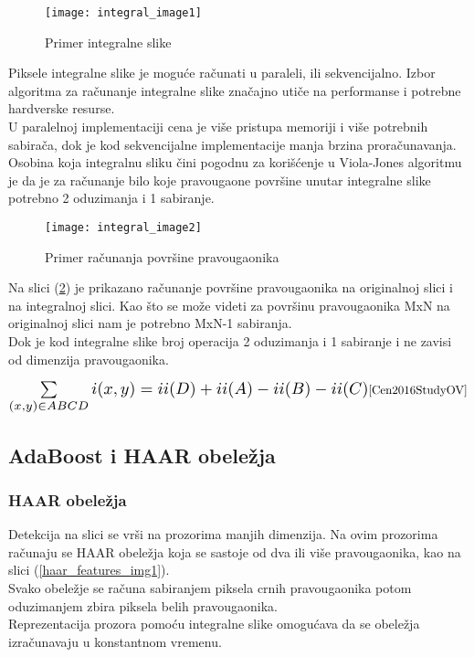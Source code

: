 \begin{figure}[h]
  \centering
  \texttt{[image: integral\_image1]}
  \caption{Primer integralne slike}
  \label{IntegralImage_img1}
\end{figure}

Piksele integralne slike je moguće računati u paraleli, ili
sekvencijalno. Izbor algoritma za računanje integralne slike značajno utiče na
performanse i potrebne hardverske resurse. \\
U paralelnoj implementaciji cena je
više pristupa memoriji i više potrebnih sabirača, dok je kod sekvencijalne
implementacije manja brzina proračunavanja. \\

Osobina koja integralnu sliku čini pogodnu za korišćenje u Viola-Jones algoritmu
je da je za računanje bilo koje pravougaone površine unutar integralne slike
potrebno 2 oduzimanja i 1 sabiranje.

\begin{figure}[h]
  \centering
  \texttt{[image: integral\_image2]}
  \caption{Primer računanja površine pravougaonika \cite{IntegralImage1_web}}
  \label{IntegralImage_img2}
\end{figure}

Na slici (\ref{IntegralImage_img2}) je prikazano računanje površine pravougaonika na
originalnoj slici i na integralnoj slici.
Kao što se može videti za površinu pravougaonika MxN na originalnoj slici nam je
potrebno MxN-1 sabiranja. \\
Dok je kod integralne slike broj operacija 2 oduzimanja i 1 sabiranje i ne zavisi od dimenzija pravougaonika.

\begin{equation}
  \Scale[1.4]{\sum\limits_{(x,y)\in ABCD} i(x,y)=ii(D)+ii(A)-ii(B)-ii(C)}
  \cite{Cen2016StudyOV}
  \label{IntegralImage_eq2}
\end{equation}

\newpage

\subsection{AdaBoost i HAAR obeležja}

\subsubsection{HAAR obeležja}

Detekcija na slici se vrši na prozorima manjih dimenzija. Na ovim prozorima
računaju se HAAR obeležja koja se sastoje od dva ili više pravougaonika, kao na
slici (\ref{haar_features_img1}). \\
Svako obeležje se računa sabiranjem piksela crnih pravougaonika potom
oduzimanjem zbira piksela belih pravougaonika. \\
Reprezentacija prozora pomoću integralne slike omogućava da se obeležja izračunavaju u konstantnom vremenu.

